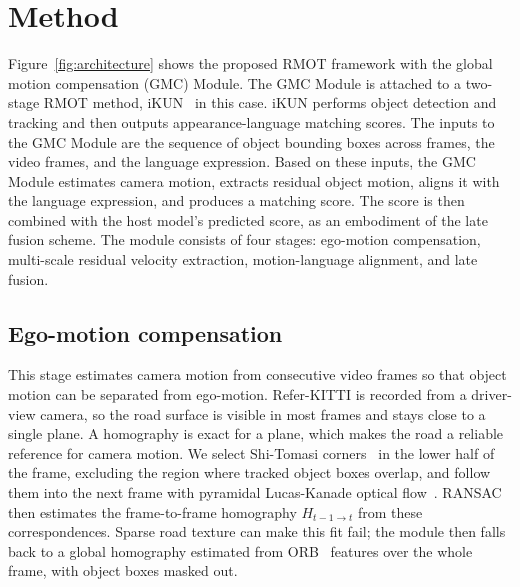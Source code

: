 \documentclass{article}
\begin{document}



\section{Method}
\label{sec:method}
Figure~\ref{fig:architecture} shows the proposed RMOT framework with the global motion compensation (GMC) Module. The GMC Module is attached to a two-stage RMOT method, iKUN~\cite{ikun} in this case. iKUN performs object detection and tracking and then outputs appearance-language matching scores. The inputs to the GMC Module are the sequence of object bounding boxes across frames, the video frames, and the language expression. Based on these inputs, the GMC Module estimates camera motion, extracts residual object motion, aligns it with the language expression, and produces a matching score. The score is then combined with the host model's predicted score, as an embodiment of the late fusion scheme. The module consists of four stages: ego-motion compensation, multi-scale residual velocity extraction, motion-language alignment, and late fusion.


\subsection{Ego-motion compensation}
\label{sec:ego}
This stage estimates camera motion from consecutive video frames so that object motion can be separated from ego-motion. Refer-KITTI is recorded from a driver-view camera, so the road surface is visible in most frames and stays close to a single plane. A homography is exact for a plane, which makes the road a reliable reference for camera motion. We select Shi-Tomasi corners~\cite{shitomasi} in the lower half of the frame, excluding the region where tracked object boxes overlap, and follow them into the next frame with pyramidal Lucas-Kanade optical flow~\cite{lucaskanade}. RANSAC~\cite{ransac} then estimates the frame-to-frame homography $H_{t-1 \to t}$ from these correspondences. Sparse road texture can make this fit fail; the module then falls back to a global homography estimated from ORB~\cite{orb} features over the whole frame, with object boxes masked out.
\end{document}
